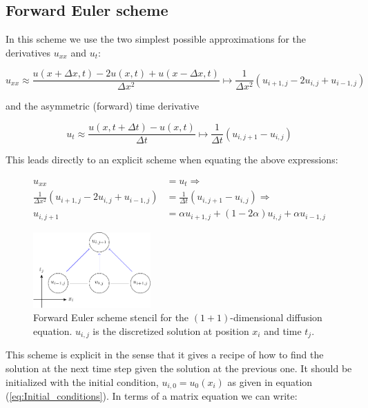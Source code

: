 \documentclass[a4paper, 11pt, notitlepage,english]{article}
\begin{document}
\subsection{Forward Euler scheme}
In this scheme we use the two simplest possible approximations for the derivatives $u_{xx}$ and $u_t$:

\begin{equation}
u_{xx} \approx \frac{u(x+\Delta x,t)-2u(x,t)+u(x-\Delta x, t)}{\Delta x^2} \mapsto \frac{1}{\Delta x^2} (u_{i+1,j}-2u_{i,j}+u_{i-1,j})
\label{eq:Forward_uxx}
\end{equation}

and the asymmetric (forward) time derivative

\begin{equation}
u_{t} \approx \frac{u(x,t+\Delta t)-u(x, t)}{\Delta t} \mapsto \frac{1}{\Delta t} (u_{i,j+1}-u_{i,j})
\label{eq:Forward_ut}
\end{equation}

This leads directly to an explicit scheme when equating the above expressions:

\begin{align}
u_{xx} &= u_t \Rightarrow \\
 \frac{1}{\Delta x^2} (u_{i+1,j}-2u_{i,j}+u_{i-1,j}) &= \frac{1}{\Delta t} (u_{i,j+1}-u_{i,j}) \Rightarrow \\
 u_{i,j+1} &= \alpha u_{i+1,j} + (1-2\alpha)u_{i,j} + \alpha u_{i-1,j}
\label{eq:Forward_Euler_scheme}
\end{align}

\begin{figure}[h!tb]
 \centering
 \includegraphics[width=0.4\textwidth]{Grid_FE-figure0}
 \caption{Forward Euler scheme stencil for the $(1+1)$-dimensional diffusion equation. $u_{i,j}$ is the discretized solution at position $x_i$ and time $t_j$.}
 \label{fig:FE_grid}
\end{figure}

This scheme is explicit in the sense that it gives a recipe of how to find the solution at the next time step given the solution at the previous one. It should be initialized with the initial condition, $u_{i,0} = u_0(x_i)$ as given in equation (\ref{eq:Initial_conditions}). In terms of a matrix equation we can write:
\end{document}
